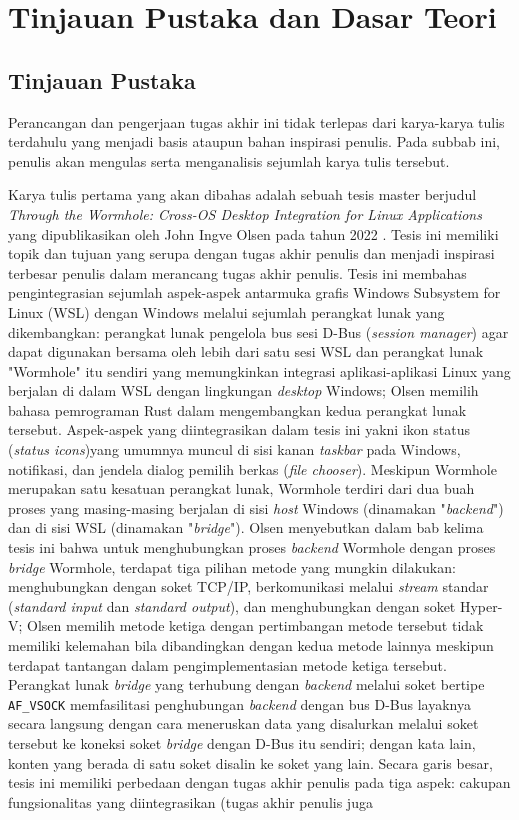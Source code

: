 \chapter{Tinjauan Pustaka dan Dasar Teori}

\section{Tinjauan Pustaka}

Perancangan dan pengerjaan tugas akhir ini tidak terlepas dari karya-karya tulis terdahulu yang menjadi basis ataupun bahan inspirasi penulis. Pada subbab ini, penulis akan mengulas serta menganalisis sejumlah karya tulis tersebut.

Karya tulis pertama yang akan dibahas adalah sebuah tesis master berjudul \textit{Through the Wormhole: Cross-OS Desktop Integration for Linux Applications} yang dipublikasikan oleh John Ingve Olsen pada tahun 2022 \cite{olsen-2022-through-the-wormhole}. Tesis ini memiliki topik dan tujuan yang serupa dengan tugas akhir penulis dan menjadi inspirasi terbesar penulis dalam merancang tugas akhir penulis. Tesis ini membahas pengintegrasian sejumlah aspek-aspek antarmuka grafis Windows Subsystem for Linux (WSL) dengan Windows melalui sejumlah perangkat lunak yang dikembangkan: perangkat lunak pengelola bus sesi D-Bus (\textit{session manager}) agar dapat digunakan bersama oleh lebih dari satu sesi WSL dan perangkat lunak "Wormhole" itu sendiri yang memungkinkan integrasi aplikasi-aplikasi Linux yang berjalan di dalam WSL dengan lingkungan \textit{desktop} Windows; Olsen memilih bahasa pemrograman Rust dalam mengembangkan kedua perangkat lunak tersebut. Aspek-aspek yang diintegrasikan dalam tesis ini yakni ikon status (\textit{status icons})yang umumnya muncul di sisi kanan \textit{taskbar} pada Windows, notifikasi, dan jendela dialog pemilih berkas (\textit{file chooser}). Meskipun Wormhole merupakan satu kesatuan perangkat lunak, Wormhole terdiri dari dua buah proses yang masing-masing berjalan di sisi \textit{host} Windows (dinamakan "\textit{backend}") dan di sisi WSL (dinamakan "\textit{bridge}"). Olsen menyebutkan dalam bab kelima tesis ini bahwa untuk menghubungkan proses \textit{backend} Wormhole dengan proses \textit{bridge} Wormhole, terdapat tiga pilihan metode yang mungkin dilakukan: menghubungkan dengan soket TCP/IP, berkomunikasi melalui \textit{stream} standar (\textit{standard input} dan \textit{standard output}), dan menghubungkan dengan soket Hyper-V; Olsen memilih metode ketiga dengan pertimbangan metode tersebut tidak memiliki kelemahan bila dibandingkan dengan kedua metode lainnya meskipun terdapat tantangan dalam pengimplementasian metode ketiga tersebut. Perangkat lunak \textit{bridge} yang terhubung dengan \textit{backend} melalui soket bertipe \verb|AF_VSOCK| memfasilitasi penghubungan \textit{backend} dengan bus D-Bus layaknya secara langsung dengan cara meneruskan data yang disalurkan melalui soket tersebut ke koneksi soket \textit{bridge} dengan D-Bus itu sendiri; dengan kata lain, konten yang berada di satu soket disalin ke soket yang lain. Secara garis besar, tesis ini memiliki perbedaan dengan tugas akhir penulis pada tiga aspek: cakupan fungsionalitas yang diintegrasikan (tugas akhir penulis juga 